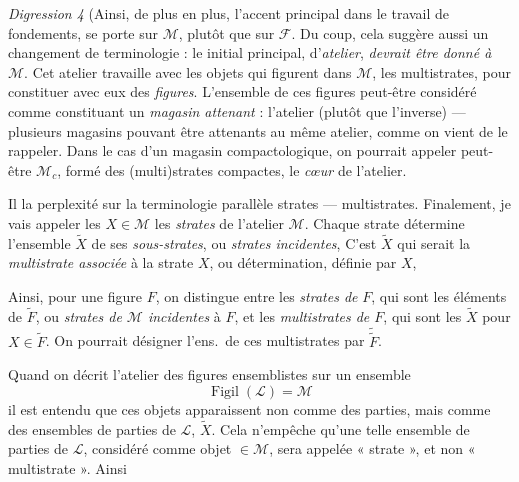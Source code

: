 \documentclass[11pt,a4paper]{article}
\begin{document}
\textit{Digression 4} \quad {} (Ainsi, de plus en plus, l'accent principal dans le travail de fondements, se porte sur $\mathcal{M}$, plutôt que sur $\mathcal{F}$. Du coup, cela suggère aussi un changement de terminologie : le   initial principal, d'\textit{atelier}, \textit{devrait être donné à $\mathcal{M}$}. Cet atelier travaille avec les objets qui figurent dans $\mathcal{M}$, les  multistrates, pour constituer avec eux des \textit{figures}. L'ensemble de ces figures peut-être considéré comme constituant un \textit{magasin attenant} : l'atelier (plutôt que l'inverse) — plusieurs magasins pouvant être attenants au même atelier, comme on vient de le rappeler. Dans le cas d'un magasin compactologique, on pourrait appeler peut-être $\mathcal{M}_c$, formé des (multi)strates compactes, le \textit{cœur} de l'atelier.

Il  la perplexité sur la terminologie parallèle strates — multistrates. Finalement, je vais appeler les $X\in\mathcal{M}$ les \textit{strates} de l'atelier $\mathcal{M}$. Chaque strate détermine l'ensemble $\widetilde{X}$ de ses \textit{sous-strates}, ou \textit{strates incidentes}, C'est $\widetilde{X}$ qui serait la \textit{multistrate associée} à la strate $X$, ou détermination, définie par $X$, 

Ainsi, pour une figure $F$, on distingue entre les \textit{strates de} $F$, qui sont les éléments de $\widetilde{F}$, ou \textit{strates de $\mathcal{M}$ incidentes} à $F$, et les \textit{multistrates de $F$}, qui sont les $\widetilde{X}$ pour $X\in\widetilde{F}$. On pourrait désigner l'ens.\ de ces multistrates par $\widetilde{\widetilde{F}}$.

Quand on décrit l'atelier des figures  ensemblistes \struck{\ill{}} sur un ensemble 
\[
  \operatorname{Figil}(\mathcal{L})=\mathcal{M}
\]
il est entendu que ces objets apparaissent  non comme des parties, mais comme des ensembles de parties de $\mathcal{L}$,  $\widetilde{X}$. Cela n'empêche qu'une telle ensemble de parties de $\mathcal{L}$, considéré comme objet $\in\mathcal{M}$, sera appelée « strate », et non « multistrate ». Ainsi
\end{document}

